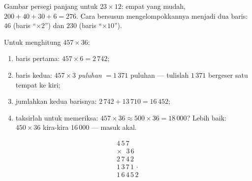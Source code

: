 \begin{omfigure}

{\small Gambar persegi panjang untuk $23 \times 12$: empat  yang mudah, $200 + 40 + 30 + 6 = 276$. Cara bersusun
mengelompokkannya menjadi dua baris: $46$ (baris ``$\times 2$'') dan
$230$ (baris ``$\times 10$'').}
\end{omfigure}

\begin{method}\label{met:g4:mult:column}
Untuk menghitung $457 \times 36$:
\begin{enumerate}
  \item baris pertama: $457 \times 6 = 2\,742$;
  \item baris kedua: $457 \times 3$ \emph{puluhan} $= 1\,371$
        puluhan --- tulislah $1\,371$ bergeser satu tempat ke kiri;
  \item jumlahkan kedua barisnya: $2\,742 + 13\,710 = 16\,452$;
  \item taksirlah untuk memeriksa: $457 \times 36 \approx 500 \times 36
        = 18\,000$? Lebih baik: $450 \times 36$ kira-kira $16\,000$
        --- masuk akal.
\end{enumerate}
\[
\begin{array}{r}
4\,5\,7 \\
\times\ \ \,3\,6 \\
\hline
2\,7\,4\,2 \\
1\,3\,7\,1\,\cdot \\
\hline
1\,6\,4\,5\,2
\end{array}
\]
\end{method}

